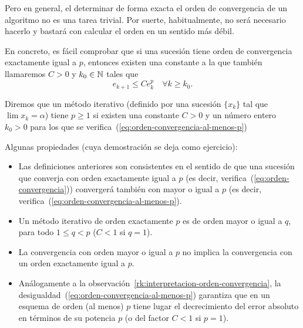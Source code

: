 Pero en general, el determinar de forma exacta el orden de
convergencia de un algoritmo no es una tarea trivial. Por suerte,
habitualmente, no será necesario hacerlo y bastará con calcular el
orden en un sentido más débil.

En concreto, es fácil comprobar que si una sucesión tiene orden de
convergencia exactamente igual a $p$, entonces existen una constante a
la que también llamaremos $C>0$ y $k_0\in\operatorname{{\mathbb N}}$ tales que
\begin{equation}
  \label{eq:orden-convergencia-al-menos-p}
  e_{k+1} \le C e_k^p \quad \forall k\ge k_0.
\end{equation}

\begin{definition}
  Diremos que un método iterativo (definido por una sucesión $\{x_k\}$
  tal que $\lim x_k=\alpha$) tiene  $p\ge 1$ si existen una constante $C>0$ y un
  número entero $k_0>0$ para los que se
  verifica~(\ref{eq:orden-convergencia-al-menos-p})
  \label{def:orden-convergencia-al-menos-p}
\end{definition}


Algunas propiedades (cuya demostración se deja como ejercicio):
\begin{itemize}
\item Las definiciones anteriores son consistentes en el sentido de
  que una sucesión que converja con orden exactamente igual a $p$ (es
  decir, verifica~(\ref{eq:orden-convergencia})) convergerá también
  con mayor o igual a $p$ (es decir,
  verifica~(\ref{eq:orden-convergencia-al-menos-p}).
\item Un método iterativo de orden exactamente $p$ es de orden mayor o
  igual a $q$, para todo $1\le q < p$ ($C<1$ si $q=1$).
\item La convergencia con orden mayor o igual a $p$ no implica la
  convergencia con un orden exactamente igual a $p$.
\item Análogamente a la
  observación~\ref{rk:interpretacion-orden-convergencia}, la
  desigualdad~(\ref{eq:orden-convergencia-al-menos-p}) garantiza que
  en un esquema de orden (al menos) $p$ tiene lugar el decrecimiento del
  error absoluto en términos de su potencia $p$ (o del factor
  $C<1$ si $p=1$).
\end{itemize}




